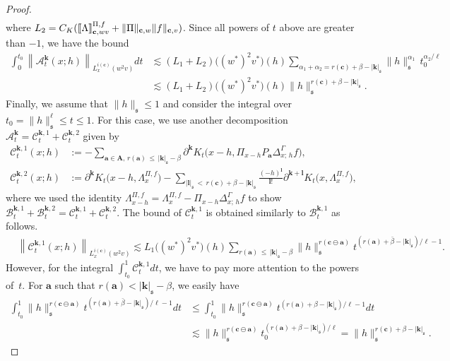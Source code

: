\documentclass[10pt]{amsart}
\theoremstyle{definition}
\numberwithin{equation}{section}
\newcommand{\mfs}{\mathfrak{s}}
\newcommand{\wco}{w^*}
\newcommand{\vco}{v^*}
\newcommand{\bfa}{\mathbf{a}}
\newcommand{\bfc}{\mathbf{c}}
\newcommand{\bfcoa}{\mathbf{c}\ominus\mathbf{a}}
\newcommand{\bfA}{\mathbf{A}}
\newcommand{\bfk}{\mathbf{k}}
\newcommand{\bfl}{\mathbf{l}}
\newcommand{\mcA}{\mathcal{A}}
\newcommand{\mcB}{\mathcal{B}}
\newcommand{\mcC}{\mathcal{C}}
\newcommand{\llbracket}{\mathopen{[\mkern -2.7mu[}}
\newcommand{\rrbracket}{\mathclose{]\mkern -2.7mu]}}
\newcommand{\lb}{\llbracket}
\newcommand{\rb}{\rrbracket}
\begin{document}
\begin{proof}
\begin{align*}
\end{align*}
where $L_2=C_K(\lb\Lambda\rb_{\bfc,wv}^{\Pi,f}+\|\Pi\|_{\bfc,w}\|f\|_{\bfc,v})$. Since all powers of $t$ above are greater than $-1$, we have the bound
\begin{align*}
\int_0^{t_0}\left\|\mcA_t^{\bfk}(x;h)\right\|_{L_x^{i(\bfc)}(w^2v)}dt &\lesssim(L_1+L_2)\big((\wco)^2\vco\big)(h)
\sum_{\alpha_1+\alpha_2=r(\bfc)+\beta-|{\bfk}|_{\mfs}}\|h\|_{\mfs}^{\alpha_1}\, t_0^{\alpha_2/\ell}\\
&\lesssim(L_1+L_2)\big((\wco)^2\vco\big)(h)
\|h\|_{\mfs}^{r(\bfc)+\beta-|{\bfk}|_{\mfs}}.
\end{align*}
Finally, we assume that $\|h\|_\mfs\le1$ and consider the integral over $t_0=\|h\|_\mfs^\ell\le t\le1$. For this case, we use another decomposition $\mcA_t^{\bfk}=\mcC_t^{{\bfk},1}+\mcC_t^{{\bfk},2}$ given by
\begin{align*}
\mcC_t^{{\bfk},1}(x;h)&:=-\sum_{\bfa\in \bfA,\,r(\bfa)\,\le\,|{\bfk}|_{\mfs}-\beta}\partial^{\bfk}K_t\big(x-h,\Pi_{x-h} P_\bfa\Delta_{x;\,h}^\Gamma f\big),\\
\mcC_t^{{\bfk},2}(x;h)&:=\partial^{\bfk}K_t\big(x-h, \Lambda_x^{\Pi,f}\big) -\sum_{|{\bfl}|_\mfs\,<\,r(\bfc)+\beta-|{\bfk}|_\mfs}\frac{(-h)^{\bfl}}{{\bfl}!}\partial^{{\bfk}+{\bfl}}K_t\big(x,\Lambda_x^{\Pi,f}\big),
\end{align*}
where we used the identity $\Lambda_{x-h}^{\Pi,f}=\Lambda_x^{\Pi,f}-\Pi_{x-h}\Delta_{x;\,h}^\Gamma f$ to show $\mcB_t^{{\bfk},1}+\mcB_t^{{\bfk},2}=\mcC_t^{{\bfk},1}+\mcC_t^{{\bfk},2}$. The bound of $\mcC_t^{{\bfk},1}$ is obtained similarly to $\mcB_t^{{\bfk},1}$ as follows.
\begin{align*}
&\left\|\mcC_t^{{\bfk},1}(x;h)\right\|_{L_x^{i(\bfc)}(w^2v)}
\lesssim L_1\big((\wco)^2\vco\big)(h)
\sum_{r(\bfa)\,\le\,|{\bfk}|_{\mfs}-\beta}\|h\|_{\mfs}^{r(\bfcoa)}t^{\left(r(\bfa)+\bar\beta-|{\bfk}|_{\mfs}\right)/\ell-1}.
\end{align*}
However, for the integral $\int_{t_0}^1\mcC_t^{{\bfk},1}dt$, we have to pay more attention to the powers of~$t$. For $\bfa$ such that $r(\bfa)<|{\bfk}|_\mfs-\beta$, we easily have
\begin{align*}
\int_{t_0}^1\|h\|_{\mfs}^{r(\bfcoa)}t^{\left(r(\bfa)+\bar\beta-|{\bfk}|_{\mfs}\right)/\ell-1}dt &\le\int_{t_0}^1\|h\|_{\mfs}^{r(\bfcoa)}t^{(r(\bfa)+\beta-|{\bfk}|_{\mfs})/\ell-1}dt\\
&\lesssim\|h\|_{\mfs}^{r(\bfcoa)}t_0^{(r(\bfa)+\beta-|{\bfk}|_\mfs)/\ell} =\|h\|_\mfs^{r(\bfc)+\beta-|{\bfk}|_\mfs}.
\end{align*}

\end{proof}
\end{document}
